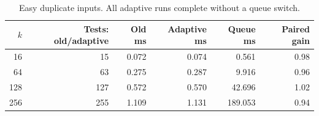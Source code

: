 \begin{table}[htbp]
\centering
\small
\begin{tabular}{rrrrrr}
\toprule
$k$ & Tests: old/adaptive & Old ms & Adaptive ms & Queue ms & Paired gain \\
\midrule
16 & 15 & 0.072 & 0.074 & 0.561 & 0.98 \\
64 & 63 & 0.275 & 0.287 & 9.916 & 0.96 \\
128 & 127 & 0.572 & 0.570 & 42.696 & 1.02 \\
256 & 255 & 1.109 & 1.131 & 189.053 & 0.94 \\
\bottomrule
\end{tabular}
\caption{Easy duplicate inputs. All adaptive runs complete without a queue switch.}
\label{tab:easy}
\end{table}
